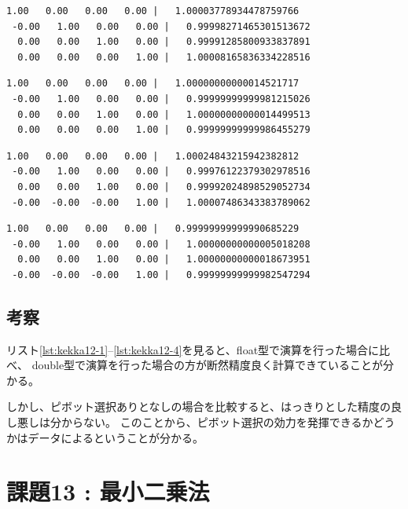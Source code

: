 \documentclass[a4j,titlepage]{jsarticle}
\begin{document}
\begin{lstlisting}[style=text,caption=ピボット選択なし/float型の実行結果,label=lst:kekka12-1]
  1.00   0.00   0.00   0.00 |   1.00003778934478759766
 -0.00   1.00   0.00   0.00 |   0.99998271465301513672
  0.00   0.00   1.00   0.00 |   0.99991285800933837891
  0.00   0.00   0.00   1.00 |   1.00008165836334228516
\end{lstlisting}

\begin{lstlisting}[style=text,caption=ピボット選択なし/double型の実行結果,label=lst:kekka12-2]
  1.00   0.00   0.00   0.00 |   1.00000000000014521717
 -0.00   1.00   0.00   0.00 |   0.99999999999981215026
  0.00   0.00   1.00   0.00 |   1.00000000000014499513
  0.00   0.00   0.00   1.00 |   0.99999999999986455279
\end{lstlisting}

\begin{lstlisting}[style=text,caption=ピボット選択あり/float型の実行結果,label=lst:kekka12-3]
  1.00   0.00   0.00   0.00 |   1.00024843215942382812
 -0.00   1.00   0.00   0.00 |   0.99976122379302978516
  0.00   0.00   1.00   0.00 |   0.99992024898529052734
 -0.00  -0.00  -0.00   1.00 |   1.00007486343383789062
\end{lstlisting}

\begin{lstlisting}[style=text,caption=ピボット選択あり/double型の実行結果,label=lst:kekka12-4]
  1.00   0.00   0.00   0.00 |   0.99999999999990685229
 -0.00   1.00   0.00   0.00 |   1.00000000000005018208
  0.00   0.00   1.00   0.00 |   1.00000000000018673951
 -0.00  -0.00  -0.00   1.00 |   0.99999999999982547294
\end{lstlisting}

\subsection{考察}
リスト\ref{lst:kekka12-1}--\ref{lst:kekka12-4}を見ると、float型で演算を行った場合に比べ、
double型で演算を行った場合の方が断然精度良く計算できていることが分かる。

しかし、ピボット選択ありとなしの場合を比較すると、はっきりとした精度の良し悪しは分からない。
このことから、ピボット選択の効力を発揮できるかどうかはデータによるということが分かる。


\section{課題13 : 最小二乗法}
\end{document}
